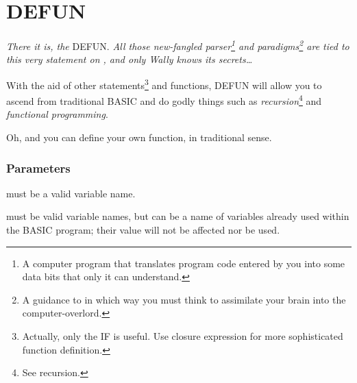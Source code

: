 \section{DEFUN}

\emph{There it is, the} DEFUN. \emph{All those new-fangled parser\footnote{A computer program that translates program code entered by you into some data bits that only it can understand.} and paradigms\footnote{A guidance to in which way you must think to assimilate your brain into the computer-overlord.} are tied to this very statement on \tbas, and only Wally knows its secrets\ldots}


With the aid of other statements\footnote{Actually, only the IF is useful. Use closure expression for more sophisticated function definition.} and functions, DEFUN will allow you to ascend from traditional BASIC and do godly things such as \emph{recursion}\footnote{See recursion.} and \emph{functional programming}.

Oh, and you can define your own function, in traditional  sense.

\subsubsection*{Parameters}

\begin{itemlist}
\item {} must be a valid variable name.
\item {} must be valid variable names, but can be a name of variables already used within the BASIC program; their value will not be affected nor be used.
\end{itemlist}

